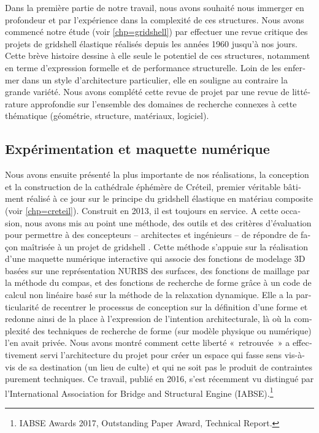 \begin{otherlanguage}{french}
Dans la première partie de notre travail, nous avons souhaité nous immerger en profondeur et par l'expérience dans la complexité de ces structures. Nous avons commencé notre étude (voir \cref{chp=gridshell}) par effectuer une revue critique des projets de gridshell élastique réalisés depuis les années 1960 jusqu'à nos jours. Cette brève histoire dessine à elle seule le potentiel de ces structures, notamment en terme d'expression formelle et de performance structurelle. Loin de les enfermer dans un style d'architecture particulier, elle en souligne au contraire la grande variété. Nous avons complété cette revue de projet par une revue de littérature approfondie sur l'ensemble des domaines de recherche connexes à cette thématique (géométrie, structure, matériaux, logiciel).

\subsection*{Expérimentation et maquette numérique}

Nous avons ensuite présenté la plus importante de nos réalisations, la conception et la construction de la cathédrale éphémère de Créteil, premier véritable bâtiment réalisé à ce jour sur le principe du gridshell élastique en matériau composite (voir \cref{chp=creteil}). Construit en 2013, il est toujours en service. A cette occasion, nous avons mis au point une méthode, des outils et des critères d'évaluation pour permettre à des concepteurs -- architectes et ingénieurs -- de répondre de façon maîtrisée à un projet de gridshell \cite{DuPeloux2016}. Cette méthode s'appuie sur la réalisation d'une maquette numérique interactive qui associe des fonctions de modelage 3D basées sur une représentation NURBS des surfaces, des fonctions de maillage par la méthode du compas, et des fonctions de recherche de forme grâce à un code de calcul non linéaire basé sur la méthode de la relaxation dynamique. Elle a la particularité de recentrer le processus de conception sur la définition d'une forme et redonne ainsi de la place à l'expression de l'intention architecturale, là où la complexité des techniques de recherche de forme (sur modèle physique ou numérique) l'en avait privée. Nous avons montré comment cette liberté « retrouvée » a effectivement servi l'architecture du projet pour créer un espace qui fasse sens vis-à-vis de sa destination (un lieu de culte) et qui ne soit pas le produit de contraintes purement techniques. Ce travail, publié en 2016, s'est récemment vu distingué par l'International Association for Bridge and Structural Engine (IABSE).\footnote{IABSE Awards 2017, Outstanding Paper Award, Technical Report.}


\end{otherlanguage}
